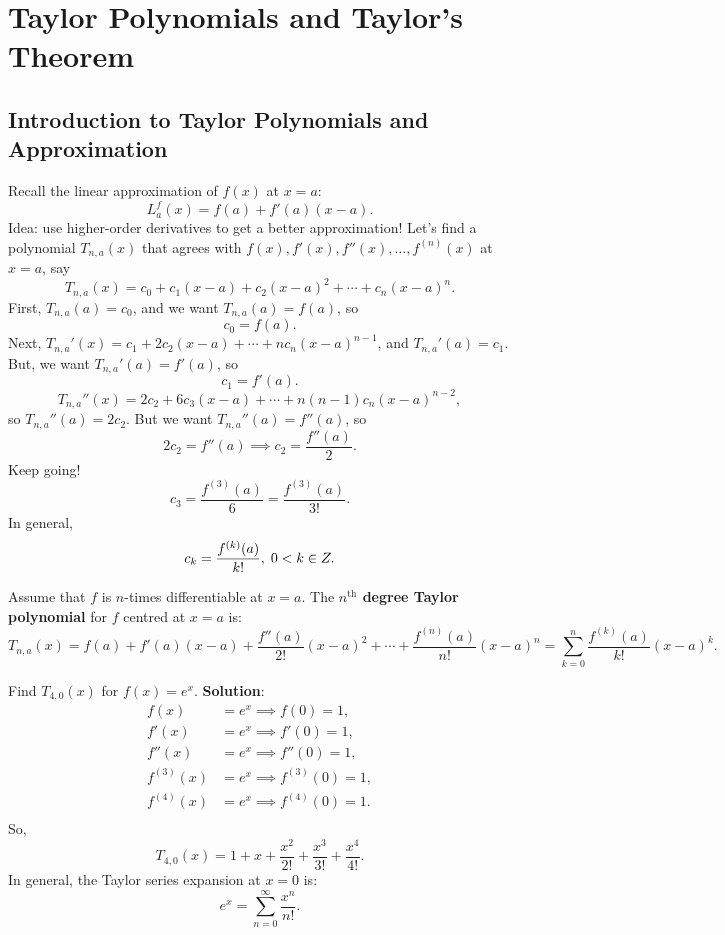 \chapter{Taylor Polynomials and Taylor's Theorem}
\section{Introduction to Taylor Polynomials and Approximation}
Recall the linear approximation of $ f(x) $ at $ x=a $:
\[ L_a^f(x)=f(a)+f'(a)(x-a). \]
Idea: use higher-order derivatives to get a better approximation! Let's find
a polynomial $ T_{n,a}(x) $ that agrees with $ f(x),f'(x),f''(x),\ldots,f^{(n)}(x) $ at $ x=a $,
say
\[ T_{n,a}(x)=c_0+c_1(x-a)+c_2(x-a)^2+\cdots+c_n(x-a)^n. \]
First, $ T_{n,a}(a)=c_0 $, and we want $ T_{n,a}(a)=f(a) $, so
\[ c_0=f(a). \]
Next, $ T_{n,a}'(x)=c_1+2c_2(x-a)+\cdots+n c_n(x-a)^{n-1} $, and
$ T_{n,a}'(a)=c_1 $. But, we want $ T_{n,a}'(a)=f'(a) $, so
\[ c_1=f'(a). \]
\[ T_{n,a}''(x)=2c_2+6c_3(x-a)+\cdots+n(n-1)c_n(x-a)^{n-2}, \]
so $ T_{n,a}''(a)=2c_2 $. But we want $ T_{n,a}''(a)=f''(a) $, so
\[ 2c_2=f''(a)\implies c_2=\frac{f''(a)}{2}. \]
Keep going!
\[ c_3=\frac{f^{(3)}(a)}{6}=\frac{f^{(3)}(a)}{3!}. \]
In general,
\[ c_k=\frac{f^{(k)}(a)}{k!},\; 0<k\in\relax{Z}. \]
\begin{Definition}{}{}
    Assume that $ f $ is $ n $-times differentiable at $ x=a $. The \textbf{$n^{\text{th}}$ degree Taylor polynomial}
    for $ f $ centred at $ x=a $ is:
    \[ T_{n,a}(x)
        =f(a)+f'(a)(x-a)+\frac{f''(a)}{2!}(x-a)^2+\cdots+\frac{f^{(n)}(a)}{n!}(x-a)^{n}
        =\sum_{k=0}^{n}\frac{f^{(k)}(a)}{k!}(x-a)^{k}. \]
\end{Definition}
\begin{Example}{}{}
    Find $ T_{4,0}(x) $ for $ f(x)=e^{x} $.
    \tcblower{}
    \textbf{Solution}:
    \begin{align*}
        f(x)       & =e^x\implies f(0)=1,       \\
        f'(x)      & =e^x\implies f'(0)=1,      \\
        f''(x)     & =e^x\implies f''(0)=1,     \\
        f^{(3)}(x) & =e^x\implies f^{(3)}(0)=1, \\
        f^{(4)}(x) & =e^x\implies f^{(4)}(0)=1. \\
    \end{align*}
    So,
    \[ T_{4,0}(x)=1+x+\frac{x^2}{2!}+\frac{x^3}{3!}+\frac{x^4}{4!}. \]
    In general, the Taylor series expansion at $ x=0 $ is:
    \[ e^x=\sum_{n=0}^{\infty}\frac{x^n}{n!}. \]
\end{Example}
